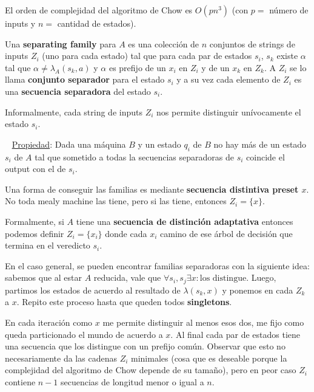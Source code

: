 \documentclass[]{article}
\begin{document}
El orden de complejidad del algoritmo de Chow es $O(pn^3)$ (con $p=$ número de inputs y $n=$ cantidad de estados).

Una \textbf{separating family} para $A$ es una colección de $n$ conjuntos de strings de inputs $Z_i$ (uno para cada estado) tal que para cada par de estados $s_i$, $s_k$ existe $\alpha$ tal que $\alpha \neq \lambda_A(s_k,a)$ y $\alpha$ es prefijo de un $x_i$ en $Z_i$ y de un $x_k$ en $Z_k$.
A $Z_i$ se lo llama \textbf{conjunto separador} para el estado $s_i$ y a su vez cada elemento de $Z_i$ es una \textbf{secuencia separadora} del estado $s_i$.

Informalmente, cada string de inputs $Z_i$ nos permite distinguir unívocamente el estado $s_i$.

~\newline
\underline{Propiedad}: Dada una máquina $B$ y un estado $q_i$ de $B$ no hay más de un estado $s_i$ de $A$ tal que sometido a todas la secuencias separadoras de $s_i$ coincide el output con el de $s_i$.

Una forma de conseguir las familias es mediante \textbf{secuencia distintiva preset $x$}. No toda mealy machine las tiene, pero si las tiene, entonces $Z_i=\{x\}$.

Formalmente, si $A$ tiene una \textbf{secuencia de distinción adaptativa} entonces podemos definir $Z_i = \{x_i\}$ donde cada $x_i$ camino de ese árbol de decisión que termina en el veredicto $s_i$.

En el caso general, se pueden encontrar familias separadoras con la siguiente idea: sabemos que al estar $A$ reducida, vale que $\forall s_i,s_j \exists x : \text{los distingue}$. Luego, partimos los estados de acuerdo al resultado de $\lambda(s_k,x)$ y ponemos en cada $Z_k$ a $x$. Repito este proceso hasta que queden todos \textbf{singletons}.

En cada iteración como $x$ me permite distinguir al menos esos dos, me fijo como queda particionado el mundo de acuerdo a $x$. Al final cada par de estados tiene una secuencia que los distingue con un prefijo común. Observar que esto no necesariamente da las cadenas $Z_i$ minimales (cosa que es deseable porque la complejidad del algoritmo de Chow depende de su tamaño), pero en peor caso $Z_i$ contiene $n-1$ secuencias de longitud menor o igual a $n$.


~\newline
\end{document}

